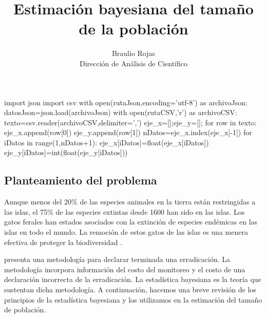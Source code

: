 \documentclass{article}
\title{Estimaci\'on bayesiana del tama\~no de la poblaci\'on}
\author{ Braulio Rojas \\ Direcci\'on de An\'alisis de Cient\'ifico}
\begin{document}
\maketitle
\begin{pycode}
import json
import csv
with open(rutaJson,encoding='utf-8') as archivoJson:
      datosJson=json.load(archivoJson)
with open(rutaCSV,'r') as archivoCSV:
      texto=csv.reader(archivoCSV,delimiter=',')
      eje_x=[];eje_y=[];
      for row in texto:
        eje_x.append(row[0])
        eje_y.append(row[1])
      nDatos=eje_x.index(eje_x[-1])
      for iDatos in range(1,nDatos+1):
        eje_x[iDatos]=float(eje_x[iDatos])
        eje_y[iDatos]=int(float(eje_y[iDatos]))
\end{pycode}
\subsection*{Planteamiento del problema}
Aunque menos del 20\% de las especies animales en la tierra est\'an restringidas
a las islas, el 75\% de las especies extintas desde 1600 han sido en las islas.
Los gatos ferales han estados asociados con la extinci\'on de especies
end\'emicas en las islas en todo el mundo. La remoci\'on de estos gatos de las
islas es una menera efectiva de proteger la biodiversidad \citep{Wood2002}.

\cite{Ramsey2010} presenta una metodolog\'ia para declarar terminada una
erradicaci\'on. La metodolog\'ia incorpora informaci\'on del costo del
monitoreo y el costo de una declaraci\'on incorrecta de la erradicaci\'on. La
estad\'istica bayesiana es la teor\'ia que sustentan dicha metodolog\'ia. A
continuaci\'on, hacemos una breve revisi\'on de los principios de la
estad\'istica bayesiana y los utilizamos en la estimaci\'on del tama\~no de
poblaci\'on.
\end{document}
